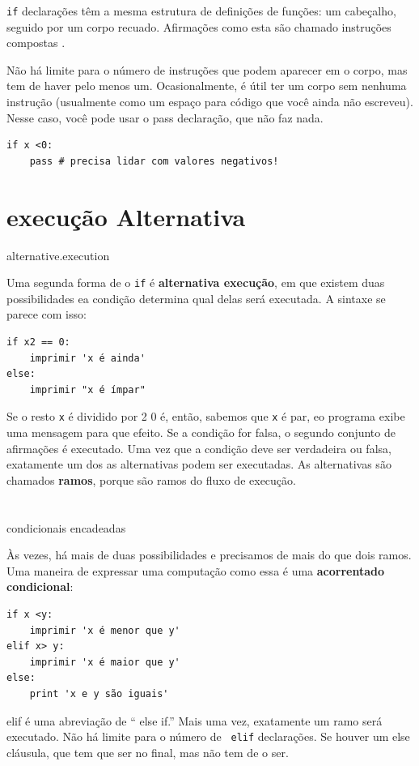 \documentclass[10pt]{book}
\begin{document}
{{\tt if} declarações têm a mesma estrutura de definições de funções:
um cabeçalho, seguido por um corpo recuado. Afirmações como esta são
chamado {instruções compostas \bf}.

Não há limite para o número de instruções que podem aparecer em
o corpo, mas tem de haver pelo menos um.
Ocasionalmente, é útil ter um corpo sem nenhuma instrução (usualmente
como um espaço para código que você ainda não escreveu). Nesse
caso, você pode usar o {pass \tt} declaração, que não faz nada.

\begin{verbatim}
if x <0:
    pass # precisa lidar com valores negativos!
\end{verbatim}
%

\section{execução Alternativa}
\label{} alternative.execution

Uma segunda forma de o {\tt if} é {\bf alternativa execução},
em que existem duas possibilidades ea condição determina
qual delas será executada. A sintaxe se parece com isso:

\begin{verbatim}
if x2 == 0:
    imprimir 'x é ainda'
else:
    imprimir "x é ímpar"
\end{verbatim}
%
Se o resto {\tt x} é dividido por 2 0 é, então,
sabemos que {\tt x} é par, eo programa exibe uma mensagem para que
efeito. Se a condição for falsa, o segundo conjunto de afirmações é
executado. Uma vez que a condição deve ser verdadeira ou falsa, exatamente um dos
as alternativas podem ser executadas. As alternativas são chamados
{\bf ramos}, porque são ramos do fluxo de execução.



\section{} condicionais encadeadas

Às vezes, há mais de duas possibilidades e precisamos de mais do que
dois ramos. Uma maneira de expressar uma computação como essa é uma {\bf
acorrentado condicional}:

\begin{verbatim}
if x <y:
    imprimir 'x é menor que y'
elif x> y:
    imprimir 'x é maior que y'
else:
    print 'x e y são iguais'
\end{verbatim}
%
{\tt} elif é uma abreviação de `` else if.'' Mais uma vez, exatamente um
ramo será executado. Não há limite para o número de {\tt
elif} declarações. Se houver um {\tt} else cláusula, que tem que ser
no final, mas não tem de o ser.


}
\end{document}

